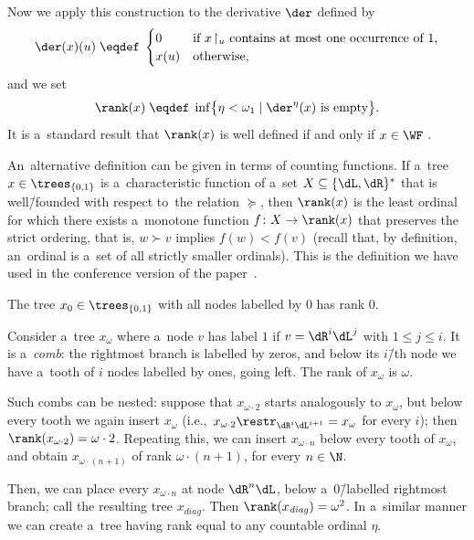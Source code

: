 Now we apply this construction to the derivative $\der$ defined by
\[
\der(x)(u) \;\eqdef\;
\begin{cases}
  0	& \text{if $x\!\restriction_u$ contains at most one occurrence of $1$,} \\
  x(u)	& \text{otherwise,}
\end{cases}
\]
and we set
\[
\rank(x) \;\eqdef\; \inf\bigl\{\eta < \omega_1 \mid \der^\eta(x) \text{ is empty}\bigr\}.
\]
\noindent %
It is a~standard result that $\rank(x)$ is well defined if and only if $x \in \WF$ \cite{kechris_descriptive}.

An~alternative definition can be given in terms of counting functions.
If a~tree $x\in\trees_{\{0,1\}}$ is a~characteristic function of a~set $X \subseteq \{\dL,\dR\}^\ast$ that is well\=/founded with respect to~the relation $\succeq$,
then $\rank(x)$ is the least ordinal for which there exists a~monotone function $f\colon X \to \rank(x)$ that preserves the strict ordering, that is, $w \succ v$ implies $f(w) < f(v)$
(recall that, by definition, an~ordinal is a~set of all strictly smaller ordinals).
This is the definition we have used in the conference version of the paper~\cite{dichotomy-stacs}.

\begin{exa} \label{przyklad-grzebien}
	The tree $x_0\in\trees_{\{0,1\}}$ with all nodes labelled by $0$ has rank $0$.

	Consider a~tree $x_\omega$ where a~node $v$ has label $1$ if $v=\dR^i\dL^j$ with $1\leq j\leq i$.
	It is a~\emph{comb}: the rightmost branch is labelled by zeros, and below its $i$\=/th node we have a~tooth of $i$ nodes labelled by ones, going left.
	The rank of $x_\omega$ is $\omega$.

	Such combs can be nested: suppose that $x_{\omega\cdot 2}$ starts analogously to $x_\omega$, but below every tooth we again insert $x_\omega$ (i.e.,~$x_{\omega\cdot 2}\restr_{\dR^i\dL^{i+1}}=x_\omega$ for every $i$);
	then $\rank(x_{\omega\cdot 2})=\omega\cdot 2$.
	Repeating this, we can insert $x_{\omega\cdot n}$ below every tooth of $x_\omega$, and obtain $x_{\omega\cdot(n{+}1)}$ of rank $\omega\cdot(n{+}1)$, for every $n\in\N$.
	
	Then, we can place every $x_{\omega\cdot n}$ at node $\dR^n\dL$, below a~$0$\=/labelled rightmost branch; call the resulting tree $x_{\mathit{diag}}$.
	Then $\rank(x_{\mathit{diag}}) = \omega^2$.
	In a~similar manner we can create a~tree having rank equal to any countable ordinal $\eta$.
\end{exa}


